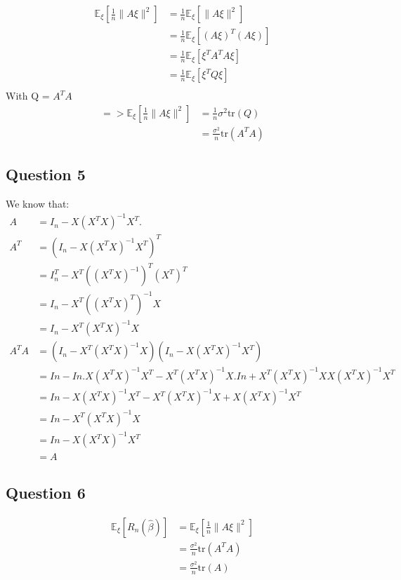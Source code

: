 \documentclass[11pt,a4paper]{article}
\theoremstyle{definition}
\theoremstyle{remark}
\begin{document}
\begin{align}
\mathbb{E}_\xi \left[ \frac{1}{n} \|A\xi\|^2 \right] &= \frac{1}{n} \mathbb{E}_\xi \left[ \|A\xi\|^2 \right] \\
&= \frac{1}{n} \mathbb{E}_\xi \left[ (A\xi)^T (A\xi) \right] \\
&= \frac{1}{n} \mathbb{E}_\xi \left[ \xi^T A^T A \xi \right] \\
&= \frac{1}{n} \mathbb{E}_\xi \left[ \xi^T Q\xi \right] \\
\end{align}
With Q = $A^T A$
\begin{align}
=> \mathbb{E}_\xi \left[ \frac{1}{n} \|A\xi\|^2 \right] &= \frac{1}{n} \sigma^2 \text{tr}(Q)\\
&= \frac{\sigma^2}{n} \text{tr}(A^T A)
\end{align}

\setcounter{subsection}{3}
\subsection{Question 5}
We know that:
\begin{align}
A &= I_n - X(X^T X)^{-1} X^T. \\
A^T &= (I_n - X(X^T X)^{-1} X^T)^T \\
&= I_n^T - X^T ((X^T X)^{-1})^T (X^T)^T \\
&= I_n - X^T ((X^T X)^T)^{-1} X \\
&= I_n - X^T (X^T X)^{-1} X \\
A^T A &= (I_n - X^T (X^T X)^{-1} X)(I_n - X(X^T X)^{-1} X^T)\\
&= In - In.X(X^TX)^{-1}X^T - X^T(X^TX)^{-1}X.In + X^T(X^TX)^{-1}XX(X^TX)^{-1}X^T \\
&= In - X(X^TX)^{-1}X^T - X^T(X^TX)^{-1}X + X(X^TX)^{-1}X^T \\
&= In - X^T(X^TX)^{-1}X \\
&= In - X(X^TX)^{-1}X^T \\
&= A
\end{align}

\setcounter{subsection}{3}
\subsection{Question 6}

\begin{align}
\mathbb{E}_\xi [R_n(\hat{\beta})] &= \mathbb{E}_\xi \left[ \frac{1}{n} \|A\xi\|^2 \right] \\
&= \frac{\sigma^2}{n} \text{tr}(A^T A) \\
&= \frac{\sigma^2}{n} \text{tr}(A)
\end{align}
\end{document}
